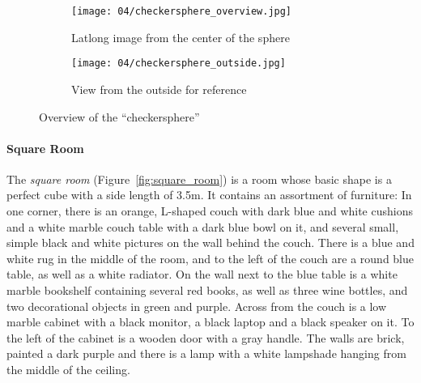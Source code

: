 \begin{figure}
\centering
    \hfill
    \begin{subfigure}[t]{0.7\textwidth}
            \centering
            \texttt{[image: 04/checkersphere\_overview.jpg]}
            \caption{Latlong image from the center of the sphere}
    \end{subfigure}%
    \hfill
    \begin{subfigure}[t]{0.3\textwidth}
            \centering
            \texttt{[image: 04/checkersphere\_outside.jpg]}
            \caption{View from the outside for reference}
    \end{subfigure}
    \hfill
  \caption{Overview of the ``checkersphere''}
  \label{fig:checkersphere}
\end{figure}

\paragraph{Square Room}
The \emph{square room} (Figure~\ref{fig:square_room}) is a room whose basic shape is a perfect cube with a side length of 3.5m. It contains an assortment of furniture\footnotemark: In one corner, there is an orange, L-shaped couch with dark blue and white cushions and a white marble couch table with a dark blue bowl on it, and several small, simple black and white pictures on the wall behind the couch. There is a blue and white rug in the middle of the room, and to the left of the couch are a round blue table, as well as a white radiator. On the wall next to the blue table is a white marble bookshelf containing several red books, as well as three wine bottles, and two decorational objects in green and purple. Across from the couch is a low marble cabinet with a black monitor, a black laptop and a black speaker on it. To the left of the cabinet is a wooden door with a gray handle. The walls are brick, painted a dark purple and there is a lamp with a white lampshade hanging from the middle of the ceiling.


